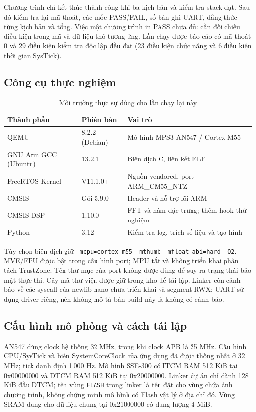 \documentclass[12pt,a4paper,oneside]{report}
\begin{document}
Chương trình chỉ kết thúc thành công khi ba kịch bản và kiểm tra stack đạt. Sau đó  kiểm tra lại mã thoát, các mốc PASS/FAIL, số bản ghi UART, đẳng thức từng kịch bản và tổng. Việc một chương trình in PASS chưa đủ: cần đối chiếu điều kiện trong mã và dữ liệu thô tương ứng. Lần chạy được báo cáo có mã thoát 0 và 29 điều kiện kiểm tra độc lập đều đạt (23 điều kiện chức năng và 6 điều kiện thời gian SysTick).

\subsection{Công cụ thực nghiệm}
\begin{table}[H]\centering\small
\caption{Môi trường thực sự dùng cho lần chạy lại này}\label{tab:ch4-tools}
\begin{tabularx}{\textwidth}{@{}p{3.1cm}p{3.2cm}X@{}}\toprule
Thành phần & Phiên bản & Vai trò \\ \midrule
QEMU & 8.2.2 (Debian) & Mô hình MPS3 AN547 / Cortex-M55 \\
GNU Arm GCC (Ubuntu) & 13.2.1 & Biên dịch C, liên kết ELF \\
FreeRTOS Kernel & V11.1.0+ & Nguồn vendored, port ARM\_CM55\_NTZ \\
CMSIS & Gói 5.9.0 & Header và hỗ trợ lõi ARM \\
CMSIS-DSP & 1.10.0 & FFT và hàm đặc trưng; thêm hook thử nghiệm \\
Python & 3.12 & Kiểm tra log, trích số liệu và tạo hình \\
\bottomrule\end{tabularx}\end{table}

Tùy chọn biên dịch giữ \texttt{-mcpu=cortex-m55 -mthumb -mfloat-abi=hard -O2}. MVE/FPU được bật trong cấu hình port; MPU tắt và không triển khai phân tách TrustZone. Tên thư mục  của port không được dùng để suy ra trạng thái bảo mật thực thi. Cây mã thư viện được giữ trong kho để tái lập. Linker còn cảnh báo về các syscall của newlib-nano chưa triển khai và segment RWX; UART sử dụng driver riêng, nên không mô tả bản build này là không có cảnh báo.

\subsection{Cấu hình mô phỏng và cách tái lập}
AN547 dùng clock hệ thống 32 MHz, trong khi clock APB là 25 MHz. Cấu hình CPU/SysTick và biến SystemCoreClock của ứng dụng đã được thống nhất ở 32 MHz; tick danh định 1\,000 Hz. Mô hình SSE-300 có ITCM RAM 512 KiB tại 0x00000000 và DTCM RAM 512 KiB tại 0x20000000. Linker dự án chỉ dành 128 KiB đầu DTCM; tên vùng \texttt{FLASH} trong linker là tên đặt cho vùng chứa ảnh chương trình, không chứng minh mô hình có Flash vật lý ở địa chỉ đó. Vùng SRAM dùng cho dữ liệu chung tại 0x21000000 có dung lượng 4 MiB.
\end{document}
